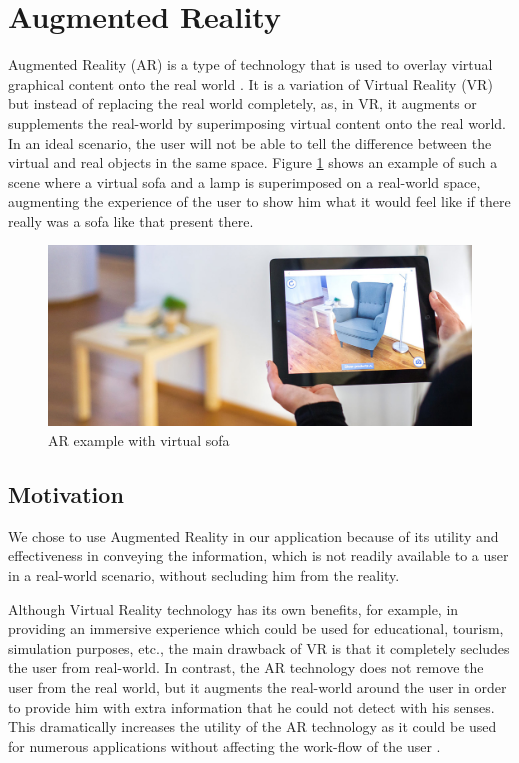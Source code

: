 \section{Augmented Reality}
Augmented Reality (AR) is a type of technology that is used to overlay virtual graphical content onto the real world \cite{silva2003introduction}. It is a variation of Virtual Reality (VR) but instead of replacing the real world completely, as, in VR, it augments or supplements the real-world by superimposing virtual content onto the real world. In an ideal scenario, the user will not be able to tell the difference between the virtual and real objects in the same space. Figure \ref{fig:ar-example-ikea} shows an example of such a scene where a virtual sofa and a lamp is superimposed on a real-world space, augmenting the experience of the user to show him what it would feel like if there really was a sofa like that present there.

\begin{figure}
    \centering
        \includegraphics[width=1.00\textwidth]{images/ar-example-ikea.jpg}
    \caption{AR example with virtual sofa}
    \label{fig:ar-example-ikea}
\end{figure}

\subsection{Motivation}
We chose to use Augmented Reality in our application because of its utility and effectiveness in conveying the information, which is not readily available to a user in a real-world scenario, without secluding him from the reality.

Although Virtual Reality technology has its own benefits, for example, in providing an immersive experience which could be used for educational, tourism, simulation purposes, etc., the main drawback of VR is that it completely secludes the user from real-world. In contrast, the AR technology does not remove the user from the real world, but it augments the real-world around the user in order to provide him with extra information that he could not detect with his senses. This dramatically increases the utility of the AR technology as it could be used for numerous applications without affecting the work-flow of the user \cite{schmalstieg2016augmented}. 

